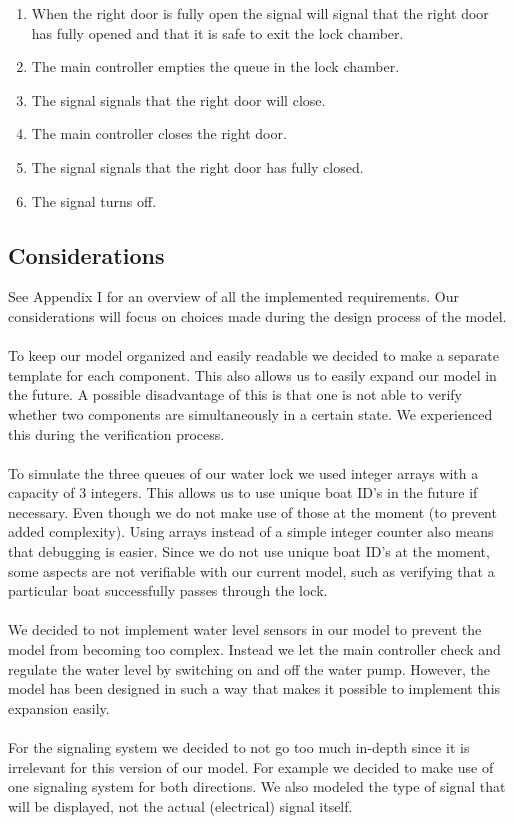 \documentclass{article}
\begin{document}
\begin{enumerate}
            \item When the right door is fully open the signal will signal that the right door has fully opened and that it is safe to exit the lock chamber.
            \item The main controller empties the queue in the lock chamber.
            \item The signal signals that the right door will close.
            \item The main controller closes the right door.
            \item The signal signals that the right door has fully closed.
            \item The signal turns off.
        \end{enumerate}
        
        
        
    \subsection{Considerations}\label{subsec:considerations} %
        See Appendix I for an overview of all the implemented requirements. Our considerations will focus on choices made during the design process of the model.\\\\
        To keep our model organized and easily readable we decided to make a separate template for each component. This also allows us to easily expand our model in the future. A possible disadvantage of this is that one is not able to verify whether two components are simultaneously in a certain state. We experienced this during the verification process.  \\\\
        To simulate the three queues of our water lock we used integer arrays with a capacity of 3 integers. This allows us to use unique boat ID's in the future if necessary. Even though we do not make use of those at the moment (to prevent added complexity). Using arrays instead of a simple integer counter also means that debugging is easier. Since we do not use unique boat ID's at the moment, some aspects are not verifiable with our current model, such as verifying that a particular boat successfully passes through the lock. \\\\
        We decided to not implement water level sensors in our model to prevent the model from becoming too complex. Instead we let the main controller check and regulate the water level by switching on and off the water pump. However, the model has been designed in such a way that makes it possible to implement this expansion easily. \\\\
        For the signaling system we decided to not go too much in-depth since it is irrelevant for this version of our model. For example we decided to make use of one signaling system for both directions. We also modeled the type of signal that will be displayed, not the actual (electrical) signal itself. 
\end{document}
